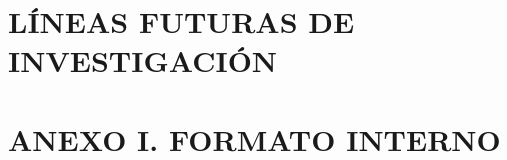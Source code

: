 \documentclass[12pt]{article}
\begin{document}
\newpage
\section{LÍNEAS FUTURAS DE INVESTIGACIÓN} 
    

\newpage

\printbibliography[title={Bibliografia}]

\newpage
\appendix
\section*{ANEXO I. \quad FORMATO INTERNO} 
    
\end{document}
